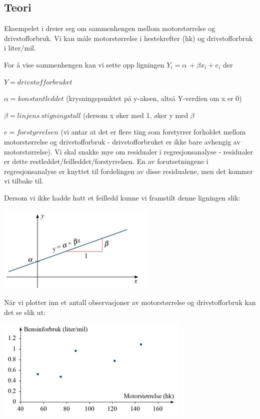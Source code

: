 \documentclass[
]{article}
\begin{document}
\hypertarget{teori}{%
\subsection{Teori}\label{teori}}

Eksempelet i \citet{lovasStatistikkUniversiteterOg2013} dreier seg om sammenhengen mellom motorstørrelse og drivstofforbruk. Vi kan måle motorstørrelse i hestekrefter (hk) og drivstofforbruk i liter/mil.

For å vise sammenhengen kan vi sette opp ligningen \(Y_i=\alpha\:+\beta x_i+e_i\) der

\(Y=drivstofforbruket\)

\(\alpha=konstantleddet\) (krysningspunktet på y-aksen, altså Y-verdien om x er 0)

\(\beta=linjens\:stigningstall\) (dersom x øker med 1, øker y med \(\beta\)

\(e=forstyrrelsen\) (vi antar at det er flere ting som forstyrrer forholdet mellom motorstørrelse og drivstofforbruk - drivstofforbruket er ikke bare avhengig av motorstørrelse). Vi skal snakke mye om residualer i regresjonsanalyse - residualer er dette restleddet/feilleddet/forstyrrelsen. En av forutsetningene i regresjonsanalyse er knyttet til fordelingen av disse residualene, men det kommer vi tilbake til.

Dersom vi ikke hadde hatt et feilledd kunne vi framstilt denne ligningen slik:

\includegraphics{Teori_fig1.png}

Når vi plotter inn et antall observasjoner av motorstørrelse og drivstofforbruk kan det se slik ut:

\includegraphics{Teori_fig2.png}
\end{document}
